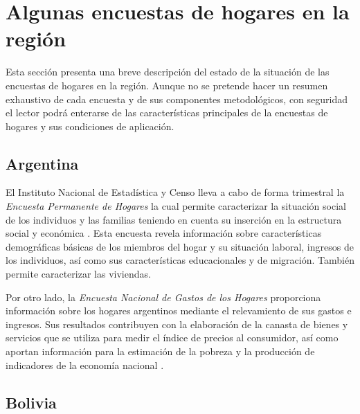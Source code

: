\documentclass[12pt,spanish,]{book}
\begin{document}
\hypertarget{algunas-encuestas-de-hogares-en-la-region}{%
\section*{Algunas encuestas de hogares en la región}\label{algunas-encuestas-de-hogares-en-la-region}}

Esta sección presenta una breve descripción del estado de la situación de las encuestas de hogares en la región. Aunque no se pretende hacer un resumen exhaustivo de cada encuesta y de sus componentes metodológicos, con seguridad el lector podrá enterarse de las características principales de la encuestas de hogares y sus condiciones de aplicación.

\hypertarget{argentina}{%
\subsection*{Argentina}\label{argentina}}

El Instituto Nacional de Estadística y Censo lleva a cabo de forma trimestral la \emph{Encuesta Permanente de Hogares} la cual permite caracterizar la situación social de los individuos y las familias teniendo en cuenta su inserción en la estructura social y económica \autocite{INDEC-AR}. Esta encuesta revela información sobre características demográficas básicas de los miembros del hogar y su situación laboral, ingresos de los individuos, así como sus características educacionales y de migración. También permite caracterizar las viviendas.

Por otro lado, la \emph{Encuesta Nacional de Gastos de los Hogares} proporciona información sobre los hogares argentinos mediante el relevamiento de sus gastos e ingresos. Sus resultados contribuyen con la elaboración de la canasta de bienes y servicios que se utiliza para medir el índice de precios al consumidor, así como aportan información para la estimación de la pobreza y la producción de indicadores de la economía nacional \autocite{INDEC-AR2}.

\hypertarget{bolivia}{%
\subsection*{Bolivia}\label{bolivia}}
\end{document}
